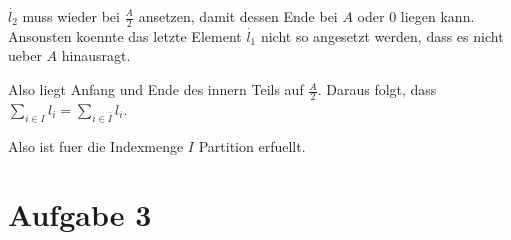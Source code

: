 $\dot{l_2}$ muss wieder bei $\frac{A}{2}$ ansetzen, damit dessen Ende bei $A$ oder $0$ liegen kann.
Ansonsten koennte das letzte Element $\dot{l_1}$ nicht so angesetzt werden, dass es nicht ueber $A$ hinausragt.

Also liegt Anfang und Ende des innern Teils auf $\frac{A}{2}$. Daraus folgt, dass
$\sum_{i\in I} l_i = \sum_{i\in \bar{I}} l_i$.

Also ist fuer die Indexmenge $I$ Partition erfuellt.




\section*{Aufgabe 3}



